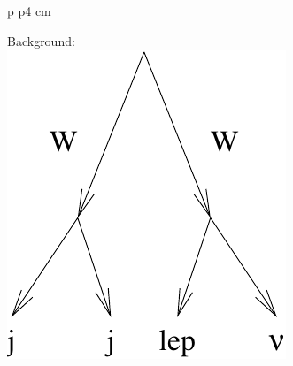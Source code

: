 \documentclass[landscape]{article}
\begin{document}
\begin{center}
\begin{tabular}{p{\textheight} p{4 cm}}
\begin{minipage}{\linewidth}
      \vspace{1 cm}
      Background: \\
      \includegraphics[width=\linewidth]{charginos_background.pdf}
    \end{minipage}
  \end{tabular}
\end{center}
\pagebreak
\end{document}
